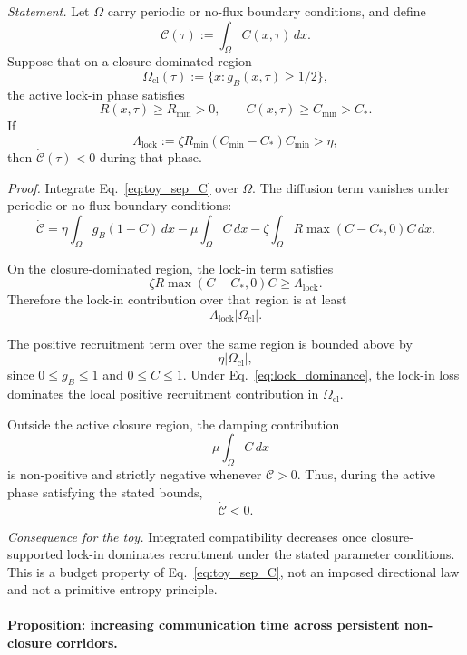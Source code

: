 \documentclass[aps,prx,onecolumn,11pt]{revtex4-2}
\theoremstyle{plain}
\theoremstyle{definition}
\theoremstyle{remark}
\begin{document}
\emph{Statement.}
Let \(\Omega\) carry periodic or no-flux boundary conditions, and define
\[
\mathcal C(\tau)
:=
\int_\Omega C(x,\tau)\,dx.
\]
Suppose that on a closure-dominated region
\[
\Omega_{\mathrm{cl}}(\tau)
:=
\{x:g_B(x,\tau)\geq 1/2\},
\]
the active lock-in phase satisfies
\[
R(x,\tau)\geq R_{\min}>0,
\qquad
C(x,\tau)\geq C_{\min}>C_\ast.
\]
If
\begin{equation}
\Lambda_{\mathrm{lock}}
:=
\zeta R_{\min}(C_{\min}-C_\ast)C_{\min}
>\eta,
\label{eq:lock_dominance}
\end{equation}
then \(\dot{\mathcal C}(\tau)<0\) during that phase.

\emph{Proof.}
Integrate Eq.~\eqref{eq:toy_sep_C} over \(\Omega\). The diffusion term
vanishes under periodic or no-flux boundary conditions:
\begin{equation}
\dot{\mathcal C}
=
\eta\int_\Omega g_B(1-C)\,dx
-\mu\int_\Omega C\,dx
-\zeta\int_\Omega R\max(C-C_\ast,0)C\,dx.
\label{eq:C_budget}
\end{equation}

On the closure-dominated region, the lock-in term satisfies
\[
\zeta R\max(C-C_\ast,0)C
\geq
\Lambda_{\mathrm{lock}}.
\]
Therefore the lock-in contribution over that region is at least
\[
\Lambda_{\mathrm{lock}}|\Omega_{\mathrm{cl}}|.
\]

The positive recruitment term over the same region is bounded above by
\[
\eta|\Omega_{\mathrm{cl}}|,
\]
since \(0\leq g_B\leq1\) and \(0\leq C\leq1\). Under
Eq.~\eqref{eq:lock_dominance}, the lock-in loss dominates the local
positive recruitment contribution in \(\Omega_{\mathrm{cl}}\).

Outside the active closure region, the damping contribution
\[
-\mu\int_\Omega C\,dx
\]
is non-positive and strictly negative whenever \(\mathcal C>0\).
Thus, during the active phase satisfying the stated bounds,
\[
\dot{\mathcal C}<0.
\]

\emph{Consequence for the toy.}
Integrated compatibility decreases once closure-supported lock-in
dominates recruitment under the stated parameter conditions. This is a
budget property of Eq.~\eqref{eq:toy_sep_C}, not an imposed directional
law and not a primitive entropy principle.


\paragraph{Proposition: increasing communication time across persistent non-closure corridors.}
\end{document}
